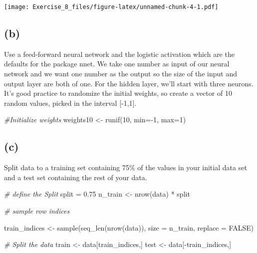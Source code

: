 \documentclass[
]{article}
\newenvironment{Shaded}{\begin{snugshade}}{\end{snugshade}}
\newcommand{\AttributeTok}[1]{\textcolor[rgb]{0.77,0.63,0.00}{#1}}
\newcommand{\CommentTok}[1]{\textcolor[rgb]{0.56,0.35,0.01}{\textit{#1}}}
\newcommand{\ConstantTok}[1]{\textcolor[rgb]{0.00,0.00,0.00}{#1}}
\newcommand{\DecValTok}[1]{\textcolor[rgb]{0.00,0.00,0.81}{#1}}
\newcommand{\FloatTok}[1]{\textcolor[rgb]{0.00,0.00,0.81}{#1}}
\newcommand{\FunctionTok}[1]{\textcolor[rgb]{0.00,0.00,0.00}{#1}}
\newcommand{\NormalTok}[1]{#1}
\newcommand{\OtherTok}[1]{\textcolor[rgb]{0.56,0.35,0.01}{#1}}
\newcommand{\SpecialCharTok}[1]{\textcolor[rgb]{0.00,0.00,0.00}{#1}}
\begin{document}
\texttt{[image: Exercise\_8\_files/figure-latex/unnamed-chunk-4-1.pdf]}

\hypertarget{b}{%
\subsection{(b)}\label{b}}

Use a feed-forward neural network and the logistic activation which are
the defaults for the package nnet. We take one number as input of our
neural network and we want one number as the output so the size of the
input and output layer are both of one. For the hidden layer, we'll
start with three neurons. It's good practice to randomize the initial
weights, so create a vector of 10 random values, picked in the interval
{[}-1,1{]}.

\begin{Shaded}
\begin{Highlighting}[]
\CommentTok{\#Initialize weights}
\NormalTok{weights10 }\OtherTok{\textless{}{-}} \FunctionTok{runif}\NormalTok{(}\DecValTok{10}\NormalTok{, }\AttributeTok{min=}\SpecialCharTok{{-}}\DecValTok{1}\NormalTok{, }\AttributeTok{max=}\DecValTok{1}\NormalTok{)}
\end{Highlighting}
\end{Shaded}

\hypertarget{c}{%
\subsection{(c)}\label{c}}

Split data to a training set containing 75\% of the values in your
initial data set and a test set containing the rest of your data.

\begin{Shaded}
\begin{Highlighting}[]
\CommentTok{\# define the Split}
\NormalTok{split }\OtherTok{=} \FloatTok{0.75}
\NormalTok{n\_train }\OtherTok{\textless{}{-}} \FunctionTok{nrow}\NormalTok{(data) }\SpecialCharTok{*}\NormalTok{ split}

\CommentTok{\# sample row indices}

\NormalTok{train\_indices }\OtherTok{\textless{}{-}} \FunctionTok{sample}\NormalTok{(}\FunctionTok{seq\_len}\NormalTok{(}\FunctionTok{nrow}\NormalTok{(data)), }\AttributeTok{size =}\NormalTok{ n\_train, }\AttributeTok{replace =} \ConstantTok{FALSE}\NormalTok{)}

\CommentTok{\# Split the data}
\NormalTok{train }\OtherTok{\textless{}{-}}\NormalTok{ data[train\_indices,]}
\NormalTok{test }\OtherTok{\textless{}{-}}\NormalTok{ data[}\SpecialCharTok{{-}}\NormalTok{train\_indices,]}
\end{Highlighting}
\end{Shaded}
\end{document}
